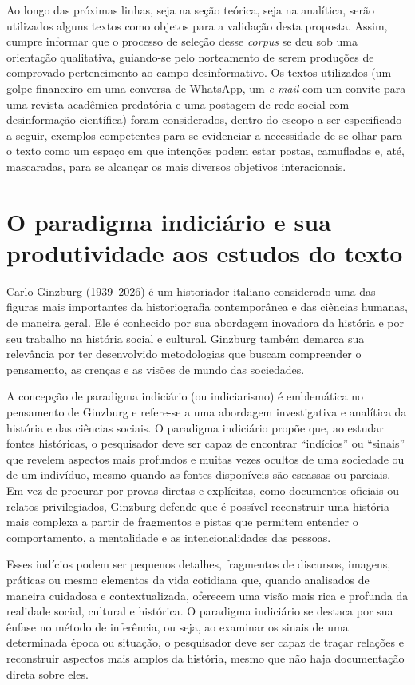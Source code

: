 \documentclass[portuguese]{textolivre}
\begin{document}
Ao longo das próximas linhas, seja na seção teórica, seja na analítica, serão utilizados alguns textos como objetos para a validação desta proposta. Assim, cumpre informar que o processo de seleção desse \textit{corpus} se deu sob uma orientação qualitativa, guiando-se pelo norteamento de serem produções de comprovado pertencimento ao campo desinformativo. Os textos utilizados (um golpe financeiro em uma conversa de WhatsApp, um \textit{e-mail} com um convite para uma revista acadêmica predatória e uma postagem de rede social com desinformação científica) foram considerados, dentro do escopo a ser especificado a seguir, exemplos competentes para se evidenciar a necessidade de se olhar para o texto como um espaço em que intenções podem estar postas, camufladas e, até, mascaradas, para se alcançar os mais diversos objetivos interacionais.

\section{O paradigma indiciário e sua produtividade aos estudos do texto}\label{sec-normas}
Carlo Ginzburg (1939–2026) é um historiador italiano considerado uma das figuras mais importantes da historiografia contemporânea e das ciências humanas, de maneira geral. Ele é conhecido por sua abordagem inovadora da história e por seu trabalho na história social e cultural. Ginzburg também demarca sua relevância por ter desenvolvido metodologias que buscam compreender o pensamento, as crenças e as visões de mundo das sociedades.

A concepção de paradigma indiciário (ou indiciarismo) é emblemática no pensamento de Ginzburg e refere-se a uma abordagem investigativa e analítica da história e das ciências sociais. O paradigma indiciário propõe que, ao estudar fontes históricas, o pesquisador deve ser capaz de encontrar “indícios” ou “sinais” que revelem aspectos mais profundos e muitas vezes ocultos de uma sociedade ou de um indivíduo, mesmo quando as fontes disponíveis são escassas ou parciais. Em vez de procurar por provas diretas e explícitas, como documentos oficiais ou relatos privilegiados, Ginzburg defende que é possível reconstruir uma história mais complexa a partir de fragmentos e pistas que permitem entender o comportamento, a mentalidade e as intencionalidades das pessoas.

Esses indícios podem ser pequenos detalhes, fragmentos de discursos, imagens, práticas ou mesmo elementos da vida cotidiana que, quando analisados de maneira cuidadosa e contextualizada, oferecem uma visão mais rica e profunda da realidade social, cultural e histórica. O paradigma indiciário se destaca por sua ênfase no método de inferência, ou seja, ao examinar os sinais de uma determinada época ou situação, o pesquisador deve ser capaz de traçar relações e reconstruir aspectos mais amplos da história, mesmo que não haja documentação direta sobre eles.
\end{document}
